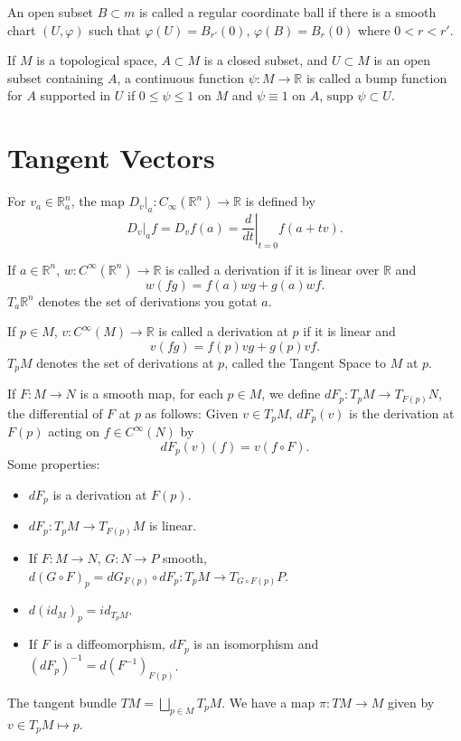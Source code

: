 \documentclass[12pt]{scrartcl}
\newcommand{\R}{\mathbb{R}}
\newcommand\at[2]{\left.#1\right|_{#2}}
\let \phi \varphi
\newcommand{\supp}{\text{supp }}
\begin{document}
\begin{definition} An open subset $B \subset m$ is called a regular coordinate ball if there is a smooth chart $(U, \phi)$ such that $\phi(U) = B_{r'}(0)$, $\phi(B) = B_r(0)$ where $0 < r < r'$.
\end{definition}

\begin{definition} If $M$ is a topological space, $A \subset M$ is a closed subset, and $U \subset M$ is an open subset containing $A$, a continuous function $\psi: M \to \R$ is called a bump function for $A$ supported in $U$ if $0 \le \psi \le 1$ on $M$ and $\psi \equiv 1$ on $A$, $\supp \psi \subset U$.
\end{definition}

\section{Tangent Vectors}
\begin{definition} For $v_a \in \R_a^n$, the map $D_v\vert_a: C_\infty(\R^n) \to \R$ is defined by
$$D_v\vert_a f = D_vf(a) = \at{\frac{d}{dt}}{t=0}f(a + tv).$$
\end{definition}
\begin{definition} If $a \in \R^n$, $w: C^\infty(\R^n) \to \R$ is called a derivation if it is linear over $\R$ and 
$$w(fg) = f(a)wg + g(a)wf.$$
$T_a\R^n$ denotes the set of derivations you gotat $a$.
\end{definition}
\begin{definition} If $p \in M$, $v: C^\infty(M) \to \R$ is called a derivation at $p$ if it is linear and
$$v(fg) = f(p)vg + g(p)vf.$$
$T_pM$ denotes the set of derivations at $p$, called the Tangent Space to $M$ at $p$.
\end{definition}
\begin{definition} If $F:M \to N$ is a smooth map, for each $p \in M$, we define 
$dF_p: T_pM \to T_{F(p)}N$, the differential of $F$ at $p$ as follows:  Given $v \in T_pM$, $dF_p(v)$ is the derivation at $F(p) $ acting on $f \in C^\infty(N)$ by $$dF_p(v)(f) = v(f \circ F).$$
Some properties:
\begin{itemize}
\item $dF_p$ is a derivation at $F(p)$.
\item $dF_p: T_pM \to T_{F(p)}M$ is linear.
\item If $F:M\to N$, $G: N \to P$ smooth, $d(G \circ F)_p = dG_{F(p)}\circ dF_p:T_pM \to T_{G \circ F(p)}P$.
\item $d(id_M)_p = id_{T_pM}$.
\item If $F$ is a diffeomorphism, $dF_p$ is an isomorphism and $(dF_p)^{-1} = d(F^{-1})_{F(p)}$.
\end{itemize}

\end{definition}
\begin{definition} The tangent bundle $TM = \bigsqcup_{p\in M} T_pM$.  We have a map $\pi: TM \to M$ given by $v \in T_pM \mapsto p$.
\end{definition}
\end{document}
